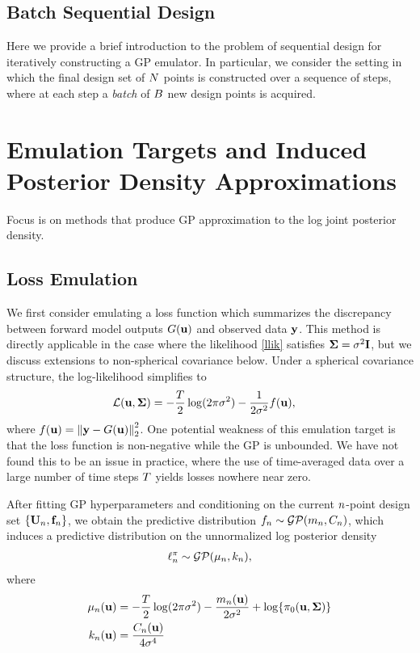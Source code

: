 \documentclass[12pt]{article}
\begin{document}
\subsection{Batch Sequential Design}
Here we provide a brief introduction to the problem of sequential design for iteratively constructing a GP emulator. In particular, we consider the 
setting in which the final design set of $N$ points is constructed over a sequence of steps, where at each step a \textit{batch} of 
$B$ new design points is acquired. 


\section{Emulation Targets and Induced Posterior Density Approximations} \label{emulation_targets}
Focus is on methods that produce GP approximation to the log joint posterior density. 

\subsection{Loss Emulation}
We first consider emulating a loss function which summarizes the discrepancy between forward model outputs $G(\mathbf{u})$ and observed 
data $\mathbf{y}$. This method is directly applicable in the case where the likelihood \ref{llik} satisfies $\boldsymbol{\Sigma} = \sigma^2 \mathbf{I}$, but we discuss 
extensions to non-spherical covariance below. Under a spherical covariance structure, the log-likelihood simplifies to 
\begin{align}
\mathcal{L}(\mathbf{u}, \boldsymbol{\Sigma}) &= -\frac{T}{2} \log(2\pi \sigma^2) - \frac{1}{2 \sigma^2} f(\mathbf{u}),
\end{align} 
where $f(\mathbf{u}) = \left\lVert\mathbf{y} - G(\mathbf{u})\right\rVert^2_2$. One potential weakness of this emulation target is that the loss function is non-negative while the 
GP is unbounded. We have not found this to be an issue in practice, where the use of time-averaged data over a large number of time steps 
$T$ yields losses nowhere near zero. 

After fitting GP hyperparameters and conditioning on the current $n$-point design set $\{\mathbf{U}_{n}, \mathbf{f}_{n}\}$, we obtain the predictive distribution 
${f}_{n} \sim \mathcal{GP}(m_{n}, C_{n})$, which induces a predictive distribution on the unnormalized log posterior density
\begin{align*}
\ell^{\pi}_{n} \sim \mathcal{GP}(\mu_{n}, k_{n}),
\end{align*}
where 
\begin{align}
\mu_{n}(\mathbf{u}) &= -\frac{T}{2} \log(2\pi \sigma^2) - \frac{m_{n}(\mathbf{u})}{2\sigma^2} + \log\mathopen{}\left\{\pi_0(\mathbf{u}, \boldsymbol{\Sigma})\right\}\mathclose{} \\
k_{n}(\mathbf{u}) &= \frac{C_{n}(\mathbf{u})}{4\sigma^4}
\end{align}
\end{document}
